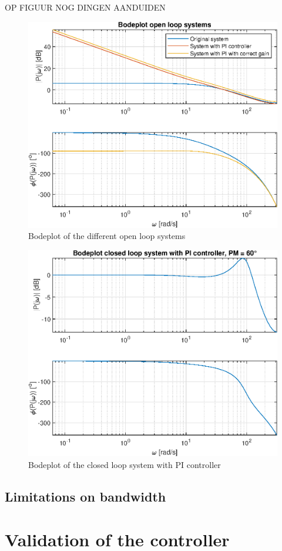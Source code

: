 \documentclass[a4paper,kul]{kulakarticle} %
\begin{document}
OP FIGUUR NOG DINGEN AANDUIDEN
\begin{figure}[htp!]
	\centering
	\includegraphics[width=0.6\linewidth]{bodeplot_openloop.eps}
	\caption{Bodeplot of the different open loop systems}
	\label{fig:bodeplotopenloop}
\end{figure}

\begin{figure}[htp!]
	\centering
	\includegraphics[width=0.6\linewidth]{bodeplot_cl.eps}
	\caption{Bodeplot of the closed loop system with PI controller}
	\label{fig:bodeplotcl}
\end{figure}




\subsection{Limitations on bandwidth}


\section{Validation of the controller}
\end{document}
